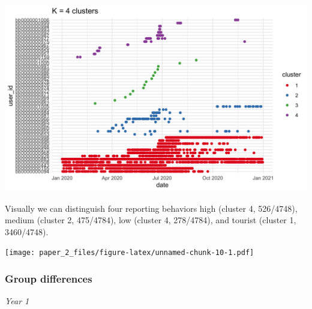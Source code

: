 \documentclass[
]{article}
\begin{document}
\includegraphics{images/y5b.png}

Visually we can distinguish four reporting behaviors high (cluster 4,
526/4748), medium (cluster 2, 475/4784), low (cluster 4, 278/4784), and
tourist (cluster 1, 3460/4748).

\texttt{[image: paper\_2\_files/figure-latex/unnamed-chunk-10-1.pdf]}

\hypertarget{group-differences-1}{%
\subsubsection{Group differences}\label{group-differences-1}}

\emph{Year 1}
\end{document}
